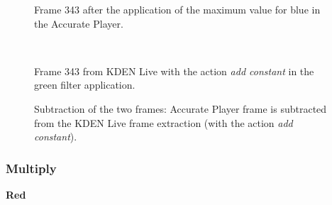 \documentclass[../MasterThesis.tex]{subfiles}
\begin{document}
\begin{minipage}{0.48\textwidth}
	\begin{figure}[H]
		\begin{center}
			\caption[]{Frame 343 after the application of the maximum value for blue in the Accurate Player.}
		\end{center}
	\end{figure}
\end{minipage}\begin{minipage}{0.04\textwidth}
	\ 
\end{minipage}\begin{minipage}{0.48\textwidth}
	\begin{figure}[H]
		\begin{center}
			\caption[]{Frame 343 from KDEN Live with the action \textit{add constant} in the green filter application.}
		\end{center}
	\end{figure}
\end{minipage}

\vspace*{-1em}



\begin{figure}[H]
	\begin{center}
		\caption[]{Subtraction of the two frames: Accurate Player frame is subtracted from the KDEN Live frame extraction (with the action \textit{add constant}).}
	\end{center}
\end{figure}

















\subsubsection*{Multiply}

\vspace*{-1em}

\textbf{Red}
\end{document}

